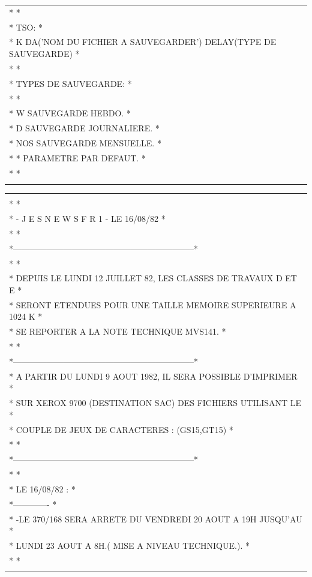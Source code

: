 {\begin{tabular}{l}
* *\\
* TSO: *\\
* K DA('NOM DU FICHIER A SAUVEGARDER') DELAY(TYPE DE SAUVEGARDE) *\\
* *\\
* TYPES DE SAUVEGARDE: *\\
* *\\
* W SAUVEGARDE HEBDO. *\\
* D SAUVEGARDE JOURNALIERE. *\\
* NOS SAUVEGARDE MENSUELLE. *\\
* * PARAMETRE PAR DEFAUT. *\\
* *\\
\unsure{********************************************************************************}
\end{tabular}}

{\ttfamily\begin{tabular}{l}
\unsure{*******************************************************************}\\
* *\\
* - J E S N E W S F R 1 - LE 16/08/82 *\\
* *\\
*-----------------------------------------------------------------*\\
* *\\
* DEPUIS LE LUNDI 12 JUILLET 82, LES CLASSES DE TRAVAUX D ET E *\\
* SERONT ETENDUES POUR UNE TAILLE MEMOIRE SUPERIEURE A 1024 K *\\
* SE REPORTER A LA NOTE TECHNIQUE MVS141. *\\
* *\\
*-----------------------------------------------------------------*\\
* A PARTIR DU LUNDI 9 AOUT 1982, IL SERA POSSIBLE D'IMPRIMER *\\
* SUR XEROX 9700 (DESTINATION SAC) DES FICHIERS UTILISANT LE *\\
* COUPLE DE JEUX DE CARACTERES : (GS15,GT15) *\\
* *\\
*-----------------------------------------------------------------*\\
* *\\
* LE 16/08/82 : *\\
*------------- *\\
* -LE 370/168 SERA ARRETE DU VENDREDI 20 AOUT A 19H JUSQU'AU *\\
* LUNDI 23 AOUT A 8H.( MISE A NIVEAU TECHNIQUE.). *\\
* *\\
\unsure{*******************************************************************}
\end{tabular}}
